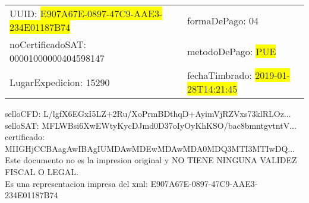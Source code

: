 \documentclass{article}
\begin{document}
\begin{tabular}{p{11cm}p{1cm}p{8cm}}
\bigskip
UUID: \colorbox{yellow}{ E907A67E-0897-47C9-AAE3-234E01187B74 } & & formaDePago: 04\\

noCertificadoSAT: 00001000000404598147 & & metodoDePago: \colorbox{yellow}{ PUE }\\

LugarExpedicion: 15290 & & fechaTimbrado: \colorbox{yellow}{ 2019-01-28T14:21:45 } \\
\end{tabular}

\bigskip
selloCFD: L/lgfX6EGxI5LZ+2Ru/XoPrmBDthqD+AyimVjRZVxs73klRLOz... \\
selloSAT: MFLWBsi6XwEWtyKycDJmd0D37oIyOyKhKSO/bac8bmntgvtntV... \\

certificado: MIIGHjCCBAagAwIBAgIUMDAwMDEwMDAwMDA0MDQ3MTI3MTIwDQ...\bigskip\bigskip\bigskip\bigskip\bigskip\bigskip
\\Este documento no es la impresion original y NO TIENE NINGUNA VALIDEZ FISCAL O LEGAL. \\
 Es una representacion impresa del xml:  E907A67E-0897-47C9-AAE3-234E01187B74 \\
\end{document}
